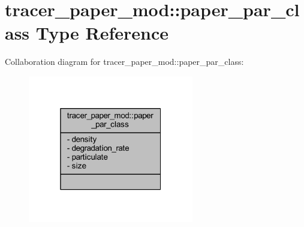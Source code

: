\hypertarget{structtracer__paper__mod_1_1paper__par__class}{}\section{tracer\+\_\+paper\+\_\+mod\+:\+:paper\+\_\+par\+\_\+class Type Reference}
\label{structtracer__paper__mod_1_1paper__par__class}


Collaboration diagram for tracer\+\_\+paper\+\_\+mod\+:\+:paper\+\_\+par\+\_\+class\+:\nopagebreak
\begin{figure}[H]
\begin{center}
\leavevmode
\includegraphics[width=205pt]{structtracer__paper__mod_1_1paper__par__class__coll__graph}
\end{center}
\end{figure}
